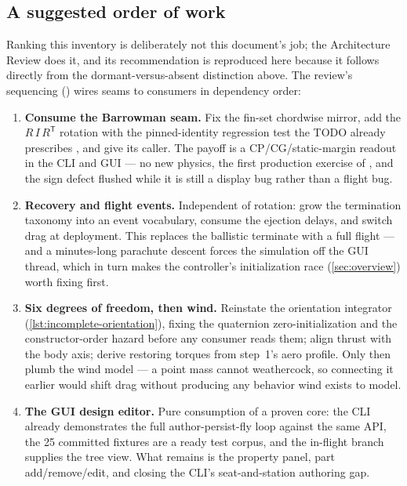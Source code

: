 \subsection{A suggested order of work}\label{sec:incomplete-sequencing}

Ranking this inventory is deliberately not this document's job; the Architecture Review
does it, and its recommendation is reproduced here because it follows directly from the
dormant-versus-absent distinction above. The review's sequencing
() wires seams to consumers in
dependency order:

\begin{enumerate}
\item \textbf{Consume the Barrowman seam.} Fix the fin-set chordwise mirror, add the
  $R\,I\,R^{\mathsf{T}}$ rotation with the pinned-identity regression test the TODO already
  prescribes , and give
   its caller. The payoff is a CP/CG/static-margin
  readout in the CLI and GUI --- no new physics, the first production exercise of
  , and the sign defect flushed while it is still a display bug
  rather than a flight bug.
\item \textbf{Recovery and flight events.} Independent of rotation: grow the termination
  taxonomy  into an event vocabulary, consume the ejection
  delays, and switch drag at deployment. This replaces the ballistic terminate with a full
  flight --- and a minutes-long parachute descent forces the simulation off the GUI thread,
  which in turn makes the controller's initialization race (\cref{sec:overview}) worth
  fixing first.
\item \textbf{Six degrees of freedom, then wind.} Reinstate the orientation integrator
  (\cref{lst:incomplete-orientation}), fixing the quaternion zero-initialization and the
  constructor-order hazard before any consumer reads them; align thrust with the body axis;
  derive restoring torques from step~1's aero profile. Only then plumb the wind model ---
  a point mass cannot weathercock, so connecting it earlier would shift drag without
  producing any behavior wind exists to model.
\item \textbf{The GUI design editor.} Pure consumption of a proven core: the CLI already
  demonstrates the full author-persist-fly loop against the same API, the 25 committed
   fixtures are a ready test corpus, and the in-flight branch supplies the tree
  view. What remains is the property panel, part add/remove/edit, and closing the CLI's
  seat-and-station authoring gap.
\end{enumerate}

